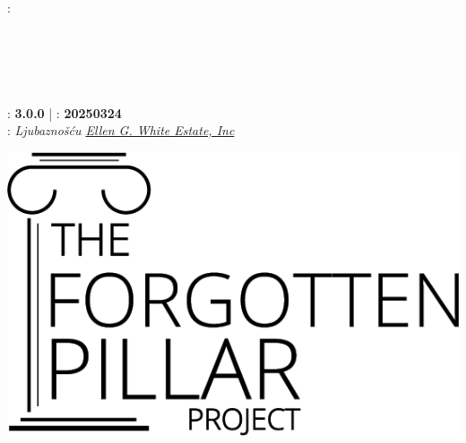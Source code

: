 \clearpage %

{\small
\setlength{\parindent}{0em}\setlength{\parskip}{0.75em}

{\large \emcap{\booktitle}}

: \textbf{\authorname} \\
\ifx\editor\undefined\else\if\relax\detokenize\expandafter{\editor}\relax{} \\ \fi\fi
\ifx\translatedby\undefined\else\if\relax\detokenize\expandafter{\translatedby}\relax{} \\ \fi\fi
\ifx\publisher\undefined\else\if\relax\detokenize\expandafter{\publisher}\relax{} \\ \fi\fi
\ifx\publishingplace\undefined\else\if\relax\detokenize\expandafter{\publishingplace}\relax{} \\ \fi\fi
\ifx\isbn\undefined\else\if\relax\detokenize\expandafter{\isbn}\relax{} \\ \fi\fi
{}: \textbf{3.0.0} | : \textbf{20250324} \\
: \textit{Ljubaznošću \href{https://ellenwhite.org/}{Ellen G. White Estate, Inc}}

\vfill

{\licensesize \licensetext}

\ifepub
    \includegraphics[width=\linewidth]{images/logo-black.png}

}
